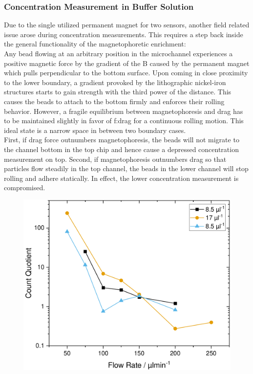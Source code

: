 \subsubsection{Concentration Measurement in Buffer Solution}
Due to the single utilized permanent magnet for two sensors, another field related issue arose during concentration measurements. This requires a step back inside the general functionality of the magnetophoretic enrichment:\\
Any bead flowing at an arbitrary position in the microchannel experiences a positive magnetic force by the gradient of the \acrlong{B} caused by the permanent magnet which pulls perpendicular to the bottom surface. Upon coming in close proximity to the lower boundary, a gradient provoked by the lithographic nickel-iron structures starts to gain strength with the third power of the distance. This causes the beads to attach to the bottom firmly and enforces their rolling behavior. However, a fragile equilibrium between magnetophoresis and drag has to be maintained slightly in favor of \acrlong{f:drag} for a continuous rolling motion. This ideal state is a narrow space in between two boundary cases. \\
First, if drag force outnumbers magnetophoresis, the beads will not migrate to the channel bottom in the top chip and hence cause a depressed concentration measurement on top. Second, if magnetophoresis outnumbers drag so that particles flow steadily in the top channel, the beads in the lower channel will stop rolling and adhere statically. In effect, the lower concentration measurement is compromised.\\
\begin{figure}[h!]
	\centering
	\includegraphics[width=.7\linewidth]{Ressources/Differential/Differential}
	\label{fig:diff:optimum}
\end{figure}
